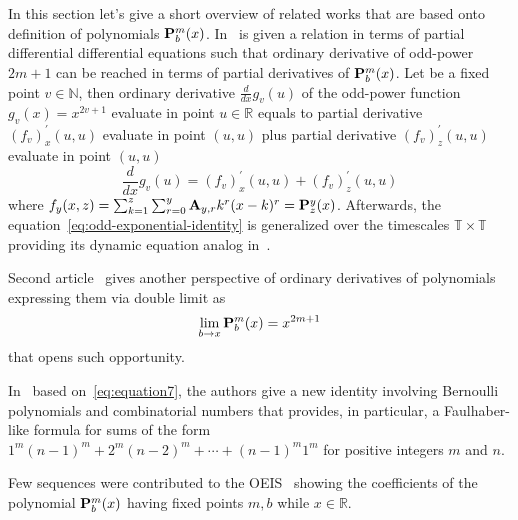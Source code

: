 In this section let's give a short overview of related works that are based onto definition
of polynomials ${\mathbf{P}}\sp{m} \sb{b}(x)$.
In~\cite{kolosov2023another} is given a relation in terms of partial differential differential equations such that
ordinary derivative of odd-power $2m+1$ can be reached in terms of partial derivatives of ${\mathbf{P}}\sp{m} \sb{b}(x)$.
Let be a fixed point $v\in \mathbb{N}$, then ordinary derivative $\frac{d}{dx} g_v (u)$ of the odd-power function $g_v(x) = x^{2v + 1}$
evaluate in point $u\in\mathbb{R}$ equals to partial derivative $(f_{v})^{'}_{x} (u, u)$ evaluate in point $(u, u)$ plus
partial derivative $(f_{v})^{'}_{z} (u, u)$ evaluate in point $(u, u)$
\begin{equation}
    \frac{d}{dx} g_v (u) = (f_{v})^{'}_{x} (u, u) + (f_{v})^{'}_{z} (u, u)
    \label{eq:odd-exponential-identity}
\end{equation}
where $f_{y} (x, z) = \sum_{k=1}^{z} \sum_{r=0}^{y} {\mathbf{A}} \sb{y,r} k^r (x-k)^r = {\mathbf{P}}\sp{y} \sb{z}(x)$.
Afterwards, the equation~\eqref{eq:odd-exponential-identity}
is generalized over the timescales $\mathbb{T} \times \mathbb{T}$ providing its dynamic equation analog
in~\cite{kolosov2016study}.

Second article~\cite{kolosov_2024_10575485} gives another perspective of ordinary derivatives of polynomials expressing
them via double limit as
\[
    \lim_{b \to x} {\mathbf{P}}\sp{m} \sb{b}(x) = x^{2m+1}
\]
that opens such opportunity.

In~\cite{barbero2020two} based on~\eqref{eq:equation7}, the authors give a new identity involving
Bernoulli polynomials and combinatorial numbers that provides,
in particular, a Faulhaber-like formula for sums of the form $1^m(n-1)^m + 2^m (n -2)^m + \cdots + (n - 1)^m 1^m$ for
positive integers $m$ and $n$.

Few sequences were contributed to the
OEIS~\cite{kolosov2018coefficientspolynomial1, kolosov2018coefficientspolynomial2, kolosov2018coefficientspolynomial3}
showing the coefficients of the polynomial ${\mathbf{P}}\sp{m} \sb{b}(x)$ having fixed points $m,b$ while $x\in\mathbb{R}$.
